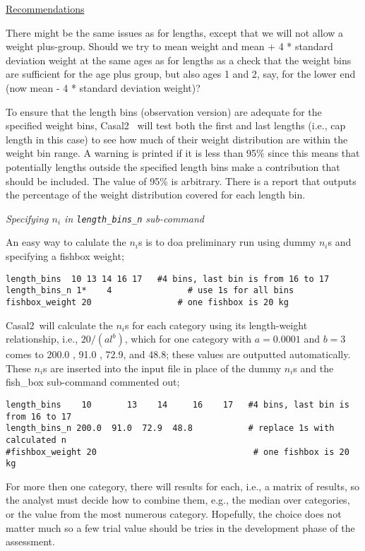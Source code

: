 \documentclass[a4paper,11pt,twoside,pdftex,draft]{article}
\newcommand{\CNAME}{Casal2}
\begin{document}
\bigskip
\underline{Recommendations}

There might be the same issues as for lengths, except that we will not allow a weight plus-group. Should we try to mean weight and mean + 4 * standard deviation weight at the same ages as for lengths as a check that the weight bins are sufficient for the age plus group, but also ages 1 and 2, say, for the lower end (now mean - 4 * standard deviation weight)?


To ensure that the length bins (observation version) are adequate for the specified weight bins, \CNAME~ will test both the first and last lengths (i.e., cap length in this case) to see how much of their weight distribution are within the weight bin range. A warning is printed if it is less than 95\% since this means that potentially lengths outside the specified length bins make a contribution that should be included. The value of 95\% is arbitrary. There is a report that outputs the percentage of the weight distribution covered for each length bin. 

\emph{Specifying $n_{i}$ in \texttt{length\_bins\_n} sub-command}

An easy way to calulate the $n_{i}$s is to doa preliminary run using dummy $n_{i}$s and specifying a fishbox weight; 
{\small{\begin{verbatim}
length_bins  10 13 14 16 17   #4 bins, last bin is from 16 to 17
length_bins_n 1*	4            	# use 1s for all bins
fishbox_weight 20                 # one fishbox is 20 kg
\end{verbatim}}}
\CNAME~will calculate the $n_{i}$s for each category using its length-weight relationship, i.e., $20/(al^{b})$, which for one category with $a = 0.0001$ and $b = 3$ comes to 200.0 , 91.0 , 72.9, and  48.8; these values are outputted automatically. These $n_{i}$s are inserted into the input file in place of the dummy $n_{i}$s and the fish\_box sub-command commented out;
{\small{\begin{verbatim}
length_bins    10       13    14     16    17   #4 bins, last bin is from 16 to 17
length_bins_n 200.0  91.0  72.9  48.8       	# replace 1s with calculated n
#fishbox_weight 20                               # one fishbox is 20 kg
\end{verbatim}}}

For more then one category, there will results for each, i.e., a matrix of results, so the analyst must decide how to combine them, e.g., the median over categories, or the value from the most numerous category. Hopefully, the choice does not matter much so a few trial value should be tries in the development phase of the assessment.
\end{document}

